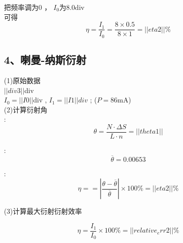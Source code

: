 \indent 把频率调为0 ， ${I}_{0}$为$8.0$div \\

\indent 可得$$\eta = \frac{{I}_{1}}{{I}_{0}} = \frac{8\times0.5}{8\times1} = ||eta2||\% $$
\subsection*{4、喇曼-纳斯衍射}
\indent (1)原始数据\\ 

\indent{}$||div3||$div \\

\indent\indent ${I}_{0} = ||I0||$div , ${I}_{1} = ||I1||div$ ; ($P = 86$mA) \\

\indent (2)计算衍射角 \\

\indent{}:$$\theta = \frac{N\cdot\Delta S}{L\cdot n} = ||theta1||$$ 

\indent{}:$$\overline{\theta} = 0.00653$$ 

\indent{}:$$\eta = = \left | \frac{\theta-\overline{\theta}}{\overline{\theta}} \right | \times100\% = ||eta2||\% $$ 

\indent (3)计算最大衍射衍射效率 

\indent $$\eta = \frac{{I}_{1}}{{I}_{0}}\times100\% = ||relative_err2||\% $$ \\